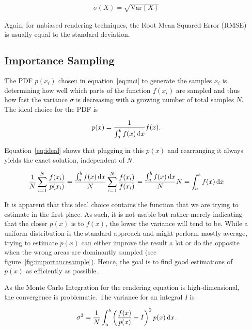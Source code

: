 \begin{align}
 \sigma(X) = \sqrt{\text{Var}(X)}
\end{align}

Again, for unbiased rendering techniques, the Root Mean Squared Error (RMSE) is usually equal to the standard deviation.

\subsection{Importance Sampling}
\label{sec:IS}

The PDF $p(x_i)$ chosen in equation~\ref{eq:mci} to generate the samples $x_i$ is determining how well which parts of the function $f(x_i)$ are sampled and thus how fast the variance $\sigma$ is decreasing with a growing number of total samples $N$. The ideal choice for the PDF is 

\begin{align}
 p(x) = \frac{1}{\int_a^b f(x) \mathop{}\!\mathrm{d} x} f(x).
\end{align}

Equation~\ref{eq:ideal} shows that plugging in this $p(x)$ and rearranging it always yields the exact solution, independent of $N$.

\begin{align}
 \label{eq:ideal}
 \frac{1}{N} \sum_{i=1}^{N} \frac{f(x_i)}{p(x_i)} = \frac{\int_a^b f(x) \mathop{}\!\mathrm{d} x}{N} \sum_{i=1}^N \frac{f(x_i)}{f(x_i)} = \frac{\int_a^b f(x) \mathop{}\!\mathrm{d} x}{N} N = \int_a^b f(x) \mathop{}\!\mathrm{d} x
\end{align}

It is apparent that this ideal choice contains the function that we are trying to estimate in the first place. As such, it is not usable but rather merely indicating that the closer $p(x)$ is to $f(x)$, the lower the variance will tend to be. While a uniform distribution is the standard approach and might perform mostly average, trying to estimate $p(x)$ can either improve the result a lot or do the opposite when the wrong areas are dominantly sampled (see figure~\ref{fig:importancesample}). Hence, the goal is to find good estimations of $p(x)$ as efficiently as possible.

As the Monte Carlo Integration for the rendering equation is high-dimensional, the convergence is problematic. The variance for an integral $I$ is

\begin{align}
 \sigma^2 = \frac{1}{N} \int_a^b \left( \frac{f(x)}{p(x)} - I \right)^2 p(x) \mathop{}\!\mathrm{d} x.
\end{align}

